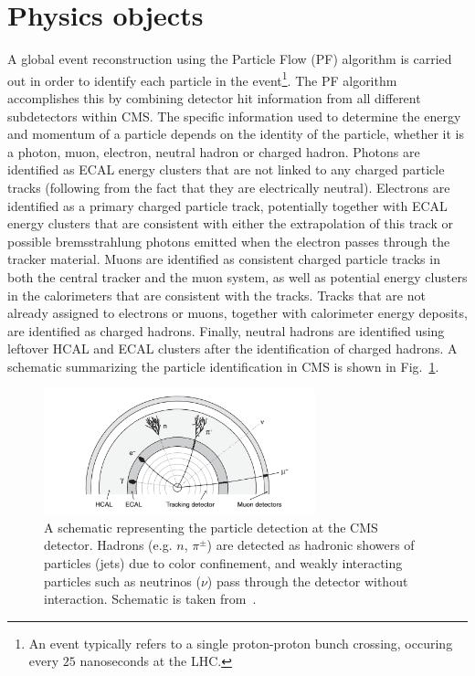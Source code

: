 \section{Physics objects} \label{sec:objects}

\graphicspath{{3_DataAnalysisStrategy/Figures}}

A global event reconstruction using the Particle Flow (PF) algorithm \cite{cms:particle_flow} is carried out in order to
identify each particle in the 
event\footnote{An event typically refers to a single proton-proton bunch crossing, occuring
every $25$ nanoseconds at the LHC.}. 
The PF algorithm accomplishes this by combining detector hit information
from all different subdetectors within CMS. The specific information used to determine the energy
and momentum of a particle depends on the identity of the particle, whether it is a photon, muon, electron,
neutral hadron or charged hadron. Photons are identified as ECAL energy clusters that are not linked to 
any charged particle tracks (following from the fact that they are electrically neutral). 
Electrons are identified as a primary charged particle track, potentially 
together with ECAL energy clusters that are consistent with either the extrapolation of this track or possible
bremsstrahlung photons emitted when the electron passes through the tracker material. Muons are identified as 
consistent charged particle tracks in both the central tracker and the muon system, as well as potential energy
clusters in the calorimeters that are consistent with the tracks. Tracks that are not already assigned to electrons or muons,
together with calorimeter energy deposits, are identified as charged hadrons. Finally, neutral hadrons are identified using leftover 
HCAL and ECAL clusters after the identification of charged hadrons. A schematic summarizing the particle identification in CMS
is shown in Fig.~\ref{fig:particle_detection_cms}.

\begin{figure}[htbp]
    \centering
    \includegraphics[width=0.7\textwidth]{particle_detection_schematic.png}
    \caption{A schematic representing the particle detection at the CMS detector.
    Hadrons (e.g. $n$, $\pi^{\pm}$) are detected as hadronic showers of particles (jets)
    due to color confinement, and weakly interacting particles such as neutrinos ($\nu$) pass through the
    detector without interaction. Schematic is taken from~\cite{Thomson:2013zua}.}
    \label{fig:particle_detection_cms}
\end{figure}

